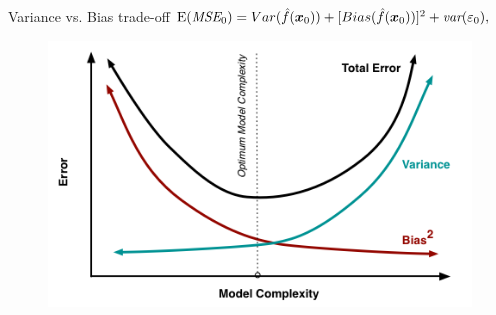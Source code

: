 \documentclass{beamer}
\begin{document}
\begin{frame}{Variance vs. Bias trade-off}
$\textnormal{E}(\textit{MSE}_0)
   = Var(\hat{f}(\bm{x}_0))
   + [Bias(\hat{f}(\bm{x}_0))]^2
   + \textit{var}(\varepsilon_0),$\\
\begin{figure}
\includegraphics[angle=0,scale=0.35]{img/biasvariance.png}
\end{figure}
\end{frame}
\end{document}
